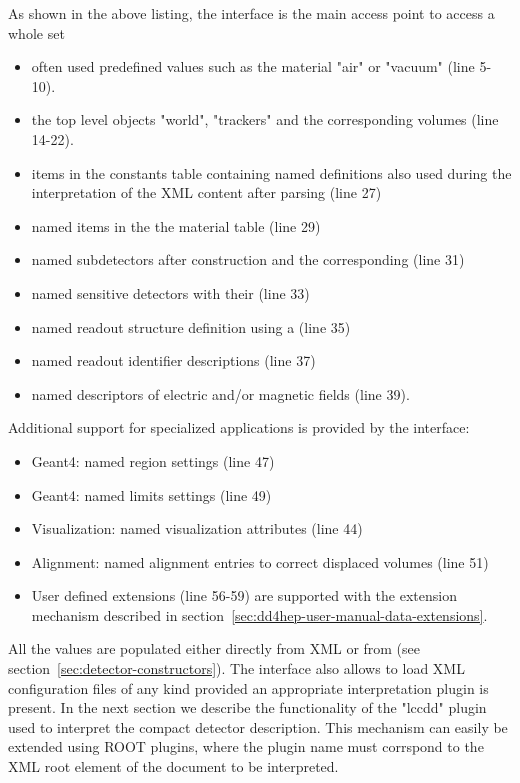 \documentclass[10pt,a4paper]{article}
\begin{document}
\noindent
As shown in the above listing, the  interface is the main access point to access
a whole set 
\begin{itemize}\itemcompact
\item often used predefined values such as the material "air" or "vacuum" (line 5-10).
\item the top level objects "world", "trackers" and the corresponding volumes (line 14-22).
\item items in the constants table containing named definitions also used during the
  interpretation of the XML content after parsing (line 27)
\item named items in the the material table (line 29)
\item named subdetectors after construction and the corresponding (line 31)
\item named sensitive detectors with their (line 33)
\item named readout structure definition using a (line 35)
\item named readout identifier descriptions (line 37)
\item named descriptors of electric and/or magnetic fields  (line 39).
\end{itemize}
Additional support for specialized applications is provided by the interface:
\begin{itemize}\itemcompact
\item Geant4: named region settings  (line 47)
\item Geant4: named limits settings  (line 49)
\item Visualization: named visualization attributes  (line 44)
\item Alignment: named alignment entries to correct displaced volumes  (line 51)
\item User defined extensions (line 56-59) are supported with the extension mechanism 
    described in section~\ref{sec:dd4hep-user-manual-data-extensions}.
\end{itemize}
All the values are populated either directly from XML or from
 (see section~\ref{sec:detector-constructors}). The interface
also allows to load XML configuration files of any kind provided an appropriate 
interpretation plugin is present. In the next section we describe the functionality 
of the "lccdd" plugin used to interpret the compact detector description.
This mechanism can easily be extended using ROOT plugins, where the 
plugin name must corrspond to the XML root element of the document to 
be interpreted.
\end{document}
